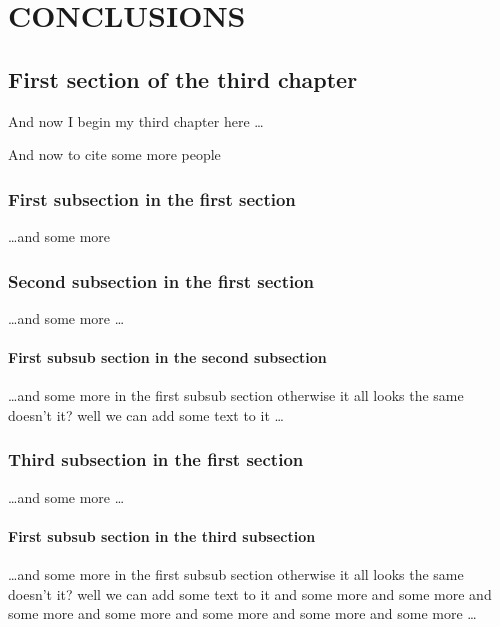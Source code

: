 \chapter{CONCLUSIONS}

\ifpdf
    \graphicspath{{Chapter5/Figs/Raster/}{Chapter5/Figs/PDF/}{Chapter5/Figs/}}
\else
    \graphicspath{{Chapter5/Figs/Vector/}{Chapter5/Figs/}}
\fi

\section{First section of the third chapter}
And now I begin my third chapter here \dots

And now to cite some more people~\citet{Rea85,Ancey1996}

\subsection{First subsection in the first section}
\dots and some more 

\subsection{Second subsection in the first section}
\dots and some more \dots

\subsubsection{First subsub section in the second subsection}
\dots and some more in the first subsub section otherwise it all looks the same
doesn't it? well we can add some text to it \dots

\subsection{Third subsection in the first section}
\dots and some more \dots

\subsubsection{First subsub section in the third subsection}
\dots and some more in the first subsub section otherwise it all looks the same
doesn't it? well we can add some text to it and some more and some more and
some more and some more and some more and some more and some more \dots

